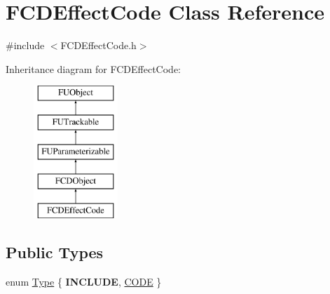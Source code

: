 \hypertarget{classFCDEffectCode}{
\section{FCDEffectCode Class Reference}
\label{classFCDEffectCode}
}


{\ttfamily \#include $<$FCDEffectCode.h$>$}

Inheritance diagram for FCDEffectCode:\begin{figure}[H]
\begin{center}
\leavevmode
\includegraphics[height=5.000000cm]{classFCDEffectCode}
\end{center}
\end{figure}
\subsection*{Public Types}
\begin{DoxyCompactItemize}
\item 
enum \hyperlink{classFCDEffectCode_a0e492088a72daaf6e6e14c50d17c9424}{Type} \{ {\bfseries INCLUDE}, 
\hyperlink{classFCDEffectCode_a0e492088a72daaf6e6e14c50d17c9424abd1a77e0d6fd232b43bd48113315b248}{CODE}
 \}
\end{DoxyCompactItemize}
